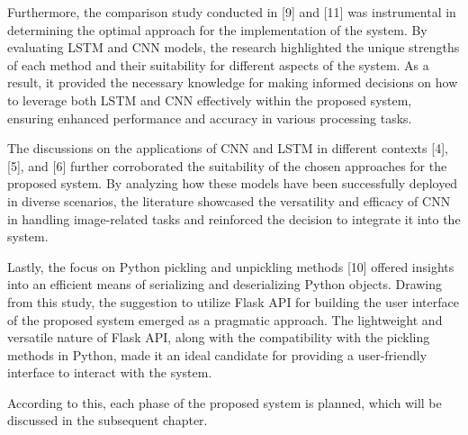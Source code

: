 \vspace{3mm}

\noindent
Furthermore, the comparison study conducted in [9] and [11] was instrumental in determining the optimal approach for the implementation of the system. By evaluating LSTM and CNN models, the research highlighted the unique strengths of each method and their suitability for different aspects of the system. As a result, it provided the necessary knowledge for making informed decisions on how to leverage both LSTM and CNN effectively within the proposed system, ensuring enhanced performance and accuracy in various processing tasks.

\vspace{3mm}

\noindent
The discussions on the applications of CNN and LSTM in different contexts [4], [5], and [6] further corroborated the suitability of the chosen approaches for the proposed system. By analyzing how these models have been successfully deployed in diverse scenarios, the literature showcased the versatility and efficacy of CNN in handling image-related tasks and reinforced the decision to integrate it into the system.

\vspace{3mm}

\noindent
Lastly, the focus on Python pickling and unpickling methods [10] offered insights into an efficient means of serializing and deserializing Python objects. Drawing from this study, the suggestion to utilize Flask API for building the user interface of the proposed system emerged as a pragmatic approach. The lightweight and versatile nature of Flask API, along with the compatibility with the pickling methods in Python, made it an ideal candidate for providing a user-friendly interface to interact with the system. 

\vspace{3mm}

\noindent
According to this, each phase of the proposed system is planned, which will be discussed in the subsequent chapter.


